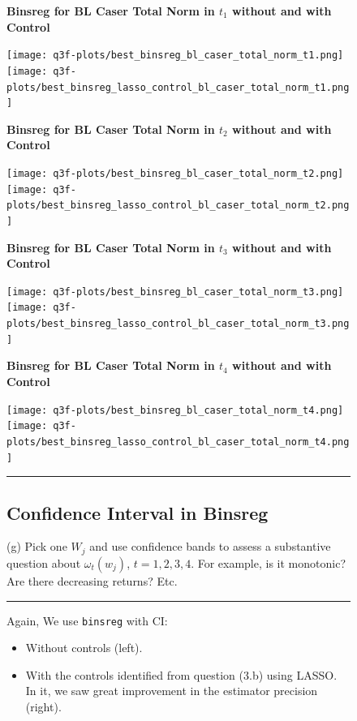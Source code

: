 \documentclass{article}
\newenvironment{colorparagraph}[1]{\par\color{#1}}{\par}
\begin{document}
{\begin{figure}[H]
  \textbf{Binsreg for BL Caser Total Norm in $t_1$ without and with Control}

    \texttt{[image: q3f-plots/best\_binsreg\_bl\_caser\_total\_norm\_t1.png]}
  \texttt{[image: q3f-plots/best\_binsreg\_lasso\_control\_bl\_caser\_total\_norm\_t1.png]}
  
  \textbf{Binsreg for BL Caser Total Norm in $t_2$ without and with Control}

  \texttt{[image: q3f-plots/best\_binsreg\_bl\_caser\_total\_norm\_t2.png]}
  \texttt{[image: q3f-plots/best\_binsreg\_lasso\_control\_bl\_caser\_total\_norm\_t2.png]}
  
  \textbf{Binsreg for BL Caser Total Norm in $t_3$ without and with Control}

  \texttt{[image: q3f-plots/best\_binsreg\_bl\_caser\_total\_norm\_t3.png]}
  \texttt{[image: q3f-plots/best\_binsreg\_lasso\_control\_bl\_caser\_total\_norm\_t3.png]}
  
  \textbf{Binsreg for BL Caser Total Norm in $t_4$ without and with Control}

  \texttt{[image: q3f-plots/best\_binsreg\_bl\_caser\_total\_norm\_t4.png]}
  \texttt{[image: q3f-plots/best\_binsreg\_lasso\_control\_bl\_caser\_total\_norm\_t4.png]}
\end{figure}
}

\begin{figure}[H]
\begin{colorparagraph}{questioncolor}
\rule{\textwidth}{0.5pt}
\label{q3g}
\subsection{Confidence Interval in Binsreg}
(g) Pick one \( W_j \) and use confidence bands to assess a substantive question about \( \omega_t(w_j) \), \( t = 1, 2, 3, 4 \). For example, is it monotonic? Are there decreasing returns? Etc.

\rule{\textwidth}{0.5pt}
\end{colorparagraph}

Again, We use \texttt{binsreg} with CI:
\begin{itemize}
  \item Without controls (left).
  \item With the controls identified from question (3.b) using LASSO. In it, we saw great improvement in the estimator precision (right).
\end{itemize}
\end{figure}
\end{document}
